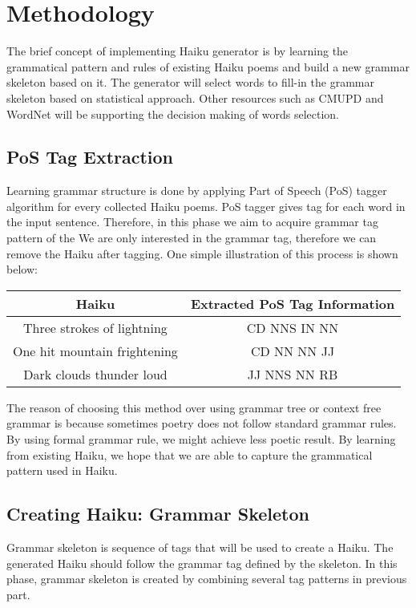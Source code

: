 \section{Methodology}

The brief concept of implementing Haiku generator is by learning the grammatical pattern and rules of existing Haiku poems and build a new grammar skeleton based on it. The generator will select words to fill-in the grammar skeleton based on statistical approach. Other resources such as CMUPD and WordNet will be supporting the decision making of words selection.

\subsection{PoS Tag Extraction}

Learning grammar structure is done by applying Part of Speech (PoS) tagger algorithm for every collected Haiku poems. PoS tagger gives tag for each word in the input sentence. Therefore, in this phase we aim to acquire grammar tag pattern of the We are only interested in the grammar tag, therefore we can remove the Haiku after tagging. One simple illustration of this process is shown below:

\begin{table}
	\centering
	\begin{tabular}{|c|c|}
		\hline Haiku & Extracted PoS Tag Information \\
		\hline Three strokes of lightning & CD NNS IN NN \\ 
		One hit mountain frightening &  CD NN NN JJ  \\ 
		Dark clouds thunder loud &  JJ NNS NN RB \\ 
		\hline
	\end{tabular} 
\end{table}
	
The reason of choosing this method over using grammar tree or context free grammar is because sometimes poetry does not follow standard grammar rules. By using formal grammar rule, we might achieve less poetic result. By learning from existing Haiku, we hope that we are able to capture the grammatical pattern used in Haiku.

\subsection{Creating Haiku: Grammar Skeleton}

Grammar skeleton is sequence of tags that will be used to create a Haiku. The generated Haiku should follow the grammar tag defined by the skeleton. In this phase, grammar skeleton is created by combining several tag patterns in previous part.

